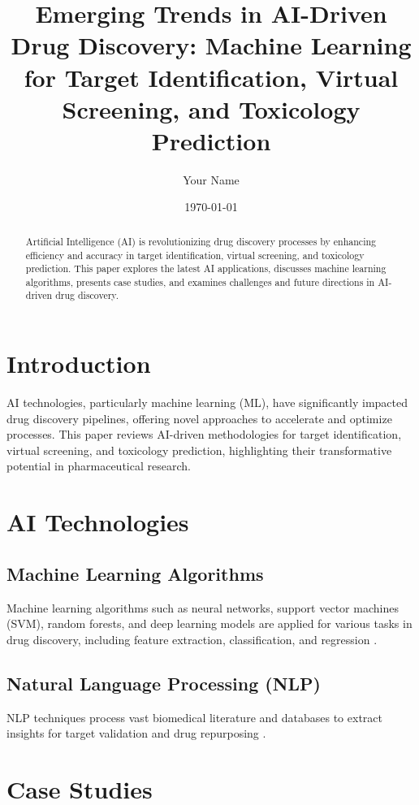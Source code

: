 \documentclass[12pt]{article}
\title{Emerging Trends in AI-Driven Drug Discovery: Machine Learning for Target Identification, Virtual Screening, and Toxicology Prediction}
\author{Your Name}
\date{\today}
\begin{document}
\maketitle

\begin{abstract}
Artificial Intelligence (AI) is revolutionizing drug discovery processes by enhancing efficiency and accuracy in target identification, virtual screening, and toxicology prediction. This paper explores the latest AI applications, discusses machine learning algorithms, presents case studies, and examines challenges and future directions in AI-driven drug discovery.
\end{abstract}

\section{Introduction}
AI technologies, particularly machine learning (ML), have significantly impacted drug discovery pipelines, offering novel approaches to accelerate and optimize processes. This paper reviews AI-driven methodologies for target identification, virtual screening, and toxicology prediction, highlighting their transformative potential in pharmaceutical research.

\section{AI Technologies}
\subsection{Machine Learning Algorithms}
Machine learning algorithms such as neural networks, support vector machines (SVM), random forests, and deep learning models are applied for various tasks in drug discovery, including feature extraction, classification, and regression \citep{unterthiner2014deep, wallach2015atomnet}.

\subsection{Natural Language Processing (NLP)}
NLP techniques process vast biomedical literature and databases to extract insights for target validation and drug repurposing \citep{krallinger2017overview, bello2017biomedical}.

\section{Case Studies}
\end{document}

